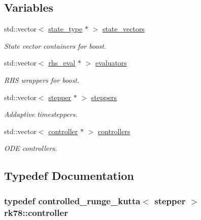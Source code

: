 \subsection*{Variables}
\begin{DoxyCompactItemize}
\item 
std\+::vector$<$ \hyperlink{namespacerk78_adee5ce562c6782cdcf0bd77d751c739a}{state\+\_\+type} $\ast$ $>$ \hyperlink{namespacerk78_a96d3a36cb53b773f2aa1a538ba9bdad1}{state\+\_\+vectors}
\begin{DoxyCompactList}\small\item\em State vector containers for boost. \end{DoxyCompactList}\item 
std\+::vector$<$ \hyperlink{classrk78_1_1rhs__eval}{rhs\+\_\+eval} $\ast$ $>$ \hyperlink{namespacerk78_a83c99482273a838fc2d7305a362cae21}{evaluators}
\begin{DoxyCompactList}\small\item\em R\+HS wrappers for boost. \end{DoxyCompactList}\item 
std\+::vector$<$ \hyperlink{namespacerk78_ac6e4b40bcf9a8f507a0bb1260f92777e}{stepper} $\ast$ $>$ \hyperlink{namespacerk78_a15830d3d7a5bea311980fcb1ccec9c91}{steppers}
\begin{DoxyCompactList}\small\item\em Addaptive timesteppers. \end{DoxyCompactList}\item 
std\+::vector$<$ \hyperlink{namespacerk78_aba972d6260988e04e23d64437536c04c}{controller} $\ast$ $>$ \hyperlink{namespacerk78_a7f7ff39cbfddcdc41eb68fd64749997f}{controllers}
\begin{DoxyCompactList}\small\item\em O\+DE controllers. \end{DoxyCompactList}\end{DoxyCompactItemize}


\subsection{Typedef Documentation}
\subsubsection[{\texorpdfstring{controller}{controller}}]{\setlength{\rightskip}{0pt plus 5cm}typedef controlled\+\_\+runge\+\_\+kutta$<$ {\bf stepper} $>$ {\bf rk78\+::controller}}\hypertarget{namespacerk78_aba972d6260988e04e23d64437536c04c}{}\label{namespacerk78_aba972d6260988e04e23d64437536c04c}


